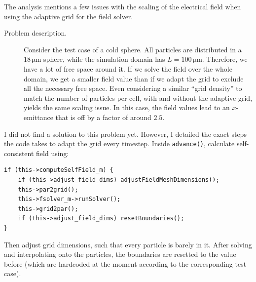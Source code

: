 The analysis mentions a few issues with the scaling of the electrical field when using the adaptive grid for the field solver. 
\begin{description}
    \item[Problem description.] Consider the test case of a cold sphere. All particles are distributed in a $18\,\si{\micro\metre}$ sphere, while the simulation domain has $L = 100\,\si{\micro\metre}$. Therefore, we have a lot of free space around it. If we solve the field over the whole domain, we get a smaller field value than if we adapt the grid to exclude all the necessary free space. Even considering a similar ``grid density'' to match the number of particles per cell, with and without the adaptive grid, yields the same scaling issue. In this case, the field values lead to an $x$-emittance that is off by a factor of around $2.5$.
\end{description}
I did not find a solution to this problem yet. However, I detailed the exact steps the code takes to adapt the grid every timestep. Inside \verb|advance()|, calculate self-consistent field using:
\begin{lstlisting}
if (this->computeSelfField_m) {
    if (this->adjust_field_dims) adjustFieldMeshDimensions(); 
    this->par2grid();
    this->fsolver_m->runSolver();
    this->grid2par();
    if (this->adjust_field_dims) resetBoundaries();
}
\end{lstlisting}
Then adjust grid dimensions, such that every particle is barely in it. After solving and interpolating onto the particles, the boundaries are resetted to the value before (which are hardcoded at the moment according to the corresponding test case).

